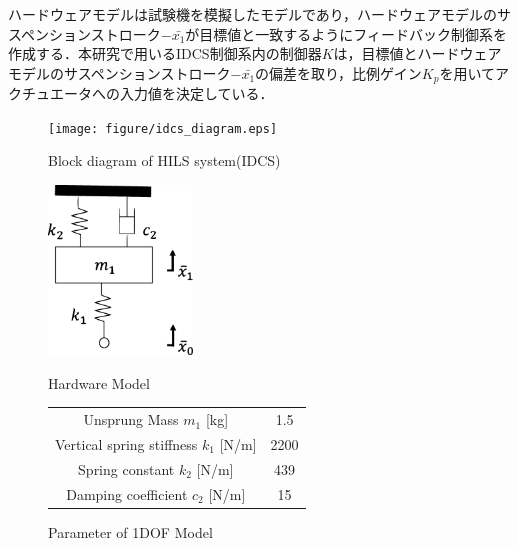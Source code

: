 \documentclass[a4paper,12pt]{article_vdlab_sotsuron}
\begin{document}
ハードウェアモデルは試験機を模擬したモデルであり，ハードウェアモデルのサスペンションストローク$-\bar{x_1}$が目標値と一致するようにフィードバック制御系を作成する．本研究で用いるIDCS制御系内の制御器$K$は，目標値とハードウェアモデルのサスペンションストローク$-\bar{x_1}$の偏差を取り，比例ゲイン$K_p$を用いてアクチュエータへの入力値を決定している．

\vspace*{7mm}
\begin{figure}[htp]
  \begin{center}
    \texttt{[image: figure/idcs\_diagram.eps]}
    \vspace*{3mm}
    \caption{Block diagram of HILS system(IDCS)}
    \label{fig:idcs_diagram}
  \end{center}
\end{figure}
\vspace{5mm}
\begin{figure}[h]
  \begin{minipage}{0.4\hsize}
     \begin{center}
      \includegraphics[height=45mm]{figure/hardware_model.eps}
	\vspace{2mm}
      \caption{Hardware Model}
      \label{fig:hardware_model}
    \end{center}
  \end{minipage}
  \vspace{7mm}
\begin{minipage}{0.6\hsize}
\makeatletter
\def\@captype{table}
\makeatother
  \begin{center}
   \caption{Parameter of 1DOF Model}
   \label{tab:parameter_1dof}
   \begin{tabular}{cc}\hline
      Unsprung Mass $m_1$ [kg] & 1.5  \\
      Vertical spring stiffness $k_1$ [N/m] & 2200  \\
      Spring constant $k_2$ [N/m] & 439   \\
      Damping coefficient $c_2$ [N/m] & 15   \\ \hline
    \end{tabular}
   \end{center}
 \end{minipage}
\end{figure}
\end{document}
